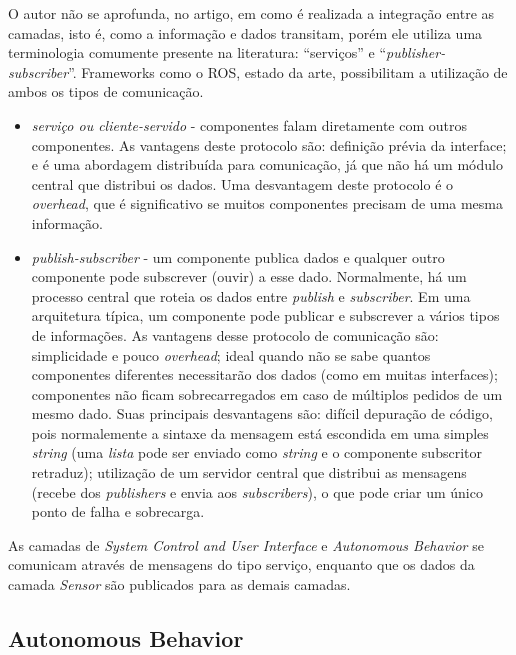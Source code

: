 O autor não se aprofunda, no artigo, em como é realizada a integração entre as
camadas, isto é, como a informação e dados transitam, porém ele utiliza
uma terminologia comumente presente na literatura: ``serviços'' e
``\textit{publisher-subscriber}''. Frameworks como o ROS, estado da arte,
possibilitam a utilização de ambos os tipos de comunicação.

\begin{itemize}
  \item \textit{serviço ou cliente-servido} -  componentes falam diretamente
  com outros componentes. As vantagens deste protocolo são: definição prévia da
  interface; e é uma abordagem distribuída para comunicação, já que não há um
  módulo central que distribui os dados. Uma desvantagem deste protocolo é o
  \textit{overhead}, que é significativo se muitos componentes precisam de uma
  mesma informação.
  
  \item \textit{publish-subscriber} - um componente publica dados e qualquer outro componente
pode subscrever (ouvir) a esse dado. Normalmente, há um processo central que
roteia os dados entre \textit{publish} e \textit{subscriber}. Em uma arquitetura
típica, um componente pode publicar e subscrever a vários tipos de informações.
As vantagens desse protocolo de comunicação são: simplicidade e pouco
\textit{overhead}; ideal quando não se sabe quantos componentes diferentes
necessitarão dos dados (como em muitas interfaces); componentes não ficam
sobrecarregados em caso de múltiplos pedidos de um mesmo dado. Suas principais
desvantagens são: difícil depuração de código, pois normalemente a sintaxe da
mensagem está escondida em uma simples \textit{string} (uma \textit{lista}
pode ser enviado como \textit{string} e o componente subscritor retraduz);
utilização de um servidor central que distribui as mensagens (recebe dos
\textit{publishers} e envia aos \textit{subscribers}), o que pode criar um único
ponto de falha e sobrecarga.
   
\end{itemize}

As camadas de \textit{System Control and User Interface} e \textit{Autonomous
Behavior} se comunicam através de mensagens do tipo serviço, enquanto que os
dados da camada \textit{Sensor} são publicados para as demais camadas.

\subsection{Autonomous Behavior}

